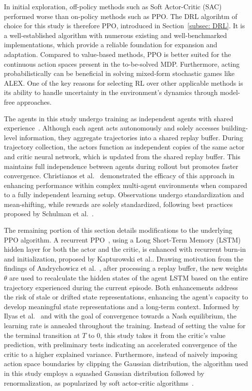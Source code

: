 \documentclass[preprint, 12pt]{elsarticle}
\begin{document}
In initial exploration, off-policy methods such as Soft Actor-Critic (SAC)~\cite{SAC} performed worse than on-policy methods such as PPO.
The DRL algorihtm of choice for this study is therefore PPO, introduced in Section~\ref{subsec: DRL}. It is a well-established algorithm with numerous existing and well-benchmarked implementations, which provide a reliable foundation for expansion and adaptation.
Compared to value-based methods, PPO is better suited for the continuous action spaces present in the to-be-solved MDP. Furthermore, acting probabilistically can be beneficial in solving mixed-form stochastic games like ALEX.
One of the key reasons for selecting RL over other applicable methods is its ability to handle uncertainty in the environment's dynamics through model-free approaches.


The agents in this study undergo training as independent agents with shared experience~\cite{SharedExperienceAC}. Although each agent acts autonomously and solely accesses building-level information, they aggregate trajectories into a shared replay buffer. During trajectory collection, the actors function as independent copies of the same actor and critic neural network, which is updated from the shared replay buffer. This maintains full independence between agents during rollout but promotes faster convergence. Christianos et al.~\cite{SharedExperienceAC} demonstrated the efficacy of this approach in enhancing performance within complex multi-agent environments when compared to a fully independent learning setup. Observations undergo standardization and mean-shifting, while rewards are solely standardized, following best practices proposed by Schulman et al.~\cite{schulman2016nuts}.

The remaining portion of this section details modifications to the underlying PPO algorithm. A recurrent PPO~\cite{SB3}, using a Long Short-Term Memory (LSTM)~\cite{lstm} hidden layer for both the actor and the critic, is enhanced with recurrent burn-in and initialization, proposed by Kapturowski et al.\cite{Kapturowski_R2D2}. Drawing motivation from the findings of Andrychowicz et al.~\cite{HiddenStateRecalc}, after processing a replay buffer, the new weights $\theta$ are used to recalculate the hidden states of the agent LSTM based on the entire trajectory experienced during the current episode. Both enhancements address the risk of stale or drifted state representations, enhancing the agent's capacity to develop meaningful state representations and a long-term context. Informed by Ilyas et al.~\cite{Ilyas_LookAtDRL_PG} and with the goal of convergence towards a Nash equilibrium, the learning rate is annealed throughout the training. Instead of setting the value for the terminal transition at $T$ to 0, this study takes it from the critic's value prediction, with preliminary tests indicating an accelerated convergence of the critic to a higher explained variance. Furthermore, instead of naively imposing action space boundaries by clipping the Gaussian distribution, the algorithm used in this study employs a squashed Gaussian distribution followed by renormalization, as popularized by soft actor-critic algorithms~\cite{SAC}.
\end{document}
